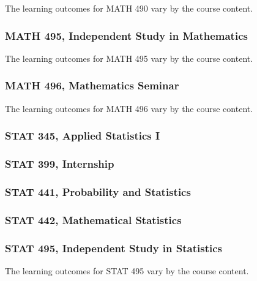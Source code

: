 \documentclass[11pt]{article}
\begin{document}
The learning outcomes for MATH 490 vary by the course content.

\subsubsection*{MATH 495, Independent Study in Mathematics}


The learning outcomes for MATH 495 vary by the course content.

\subsubsection*{MATH 496, Mathematics Seminar}

The learning outcomes for MATH 496 vary by the course content.


\subsubsection*{STAT 345, Applied Statistics I}

\subsubsection*{STAT 399, Internship}

\subsubsection*{STAT 441, Probability and Statistics}

\subsubsection*{STAT 442, Mathematical Statistics}

\subsubsection*{STAT 495, Independent Study in Statistics}

The learning outcomes for STAT 495 vary by the course content.

\end{document}
